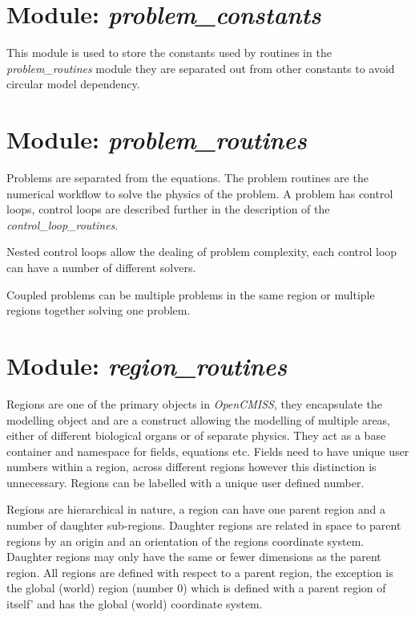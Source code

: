 \section{Module: \emph{problem\_constants}}
\label{sec:problemconstants}

This module is used to store the constants used by routines in the 
\emph{problem\_routines} module they are separated out from other 
constants to avoid circular model dependency.


\section{Module: \emph{problem\_routines}}
\label{sec:problemroutines}

Problems are separated from the equations. The problem routines are the 
numerical workflow to solve the physics of the problem. A problem has control 
loops, control loops are described further in the description of the 
\emph{control\_loop\_routines}.

Nested control loops allow the dealing of problem complexity, each control 
loop can have a number of different solvers.

Coupled problems can be multiple problems in the same region or multiple 
regions together solving one problem.


\section{Module: \emph{region\_routines}}
\label{sec:regionroutines}

Regions are one of the primary objects in \emph{OpenCMISS}, they encapsulate 
the modelling object and are a construct allowing the modelling of multiple 
areas, either of different biological organs or of separate physics. They act 
as a base container and namespace for fields, equations etc. Fields need to 
have unique user numbers within a region, across different regions however 
this distinction is unnecessary. Regions can be labelled with a unique user 
defined number. 

Regions are hierarchical in nature, a region can have one parent region and a 
number of daughter sub-regions. Daughter regions are related in space to 
parent regions by an origin and an orientation of the regions coordinate 
system. Daughter regions may only have the same or fewer dimensions as the 
parent region. All regions are defined with respect to a parent region, the 
exception is the global (world) region (number $0$) which is defined with a 
parent region of itself' and has the global (world) coordinate system.
  
